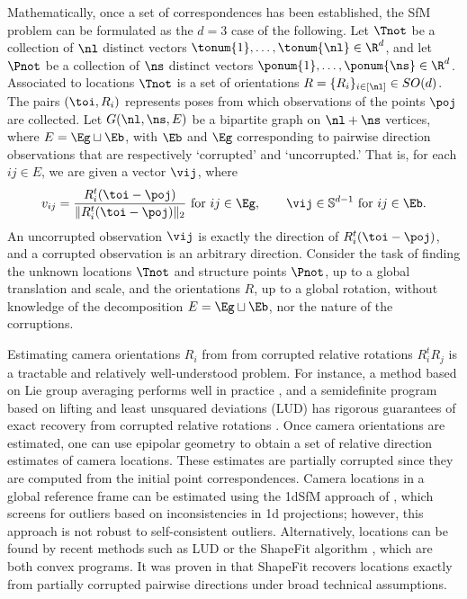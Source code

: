 Mathematically, once a set of correspondences has been established, the SfM problem can be formulated as the $d=3$ case of the following. Let $\Tnot$ be a collection of $\nl$ distinct vectors  $\tonum{1}, \ldots, \tonum{\nl} \in \R^d$, and let $\Pnot$ be a collection of $\ns$ distinct vectors  $\ponum{1}, \ldots, \ponum{\ns} \in \R^d$. Associated to locations $\Tnot$ is a set of orientations $R = \{R_i\}_{i \in [\nl]} \in SO(d)$.  The pairs $(\toi, R_i)$ represents poses from which observations  of the points $\poj$ are collected. Let $G(\nl,\ns, E)$ be a bipartite graph on $\nl + \ns$ vertices, where $E = \Eg \sqcup \Eb$, with $\Eb$ and $\Eg$ corresponding to pairwise direction observations that are respectively `corrupted' and `uncorrupted.'  That is, for each $ij \in E$, we are given a vector $\vij$, where
\begin{align*}
v_{ij} = \frac{R_i^t(\toi - \poj)}{\|R_i^t( \toi - \poj)\|_2} \text{ for } ij \in \Eg, \qquad \vij \in \mathbb{S}^{d-1} \text{ for } ij \in \Eb.
\end{align*}
An uncorrupted observation $\vij$ is exactly the direction of $R_i^t(\toi - \poj)$, and a corrupted observation is an arbitrary direction.  Consider the task of finding the unknown locations $\Tnot$ and structure points $\Pnot$, up to a global translation and scale, and the orientations $R$, up to a global rotation, without knowledge of the decomposition $E = \Eg \sqcup \Eb$, nor the nature of the corruptions. 

Estimating camera orientations $R_i$ from from corrupted relative rotations $R_i^t R_j$ is a tractable and relatively well-understood problem. For instance, a method based on Lie group averaging performs well in practice \cite{AMIT_13}, and a semidefinite program based on lifting and least unsquared deviations (LUD) has rigorous guarantees of exact recovery from corrupted relative rotations \cite{WangSingerSynchronization}.  Once camera orientations are estimated, one can use epipolar geometry to obtain a set of relative direction estimates of camera locations. These estimates are partially corrupted since they are computed from the initial point correspondences. Camera locations in a global reference frame can be estimated using the 1dSfM approach of \cite{1dsfm}, which screens for outliers based on inconsistencies in 1d projections; however, this approach is not robust to self-consistent outliers.  Alternatively, locations can be found by recent methods such as LUD \cite{AMIT} or the ShapeFit algorithm \cite{HLV2015}, which are both convex programs. It was proven in \cite{HLV2015} that ShapeFit recovers locations exactly from partially corrupted pairwise directions under broad technical assumptions. 

